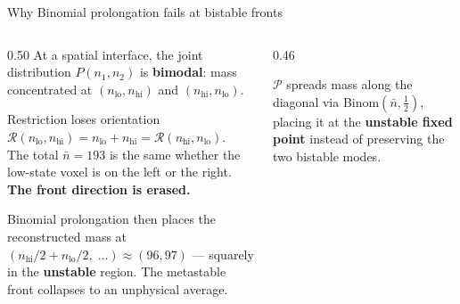 \documentclass[10pt,aspectratio=169]{beamer}
\newcommand{\calR}{\mathcal{R}}
\newcommand{\calP}{\mathcal{P}}
\begin{document}
\begin{frame}{Why Binomial prolongation fails at bistable fronts}

  \begin{columns}[T]
    \begin{column}{0.50\textwidth}
      At a spatial interface, the joint distribution $P(n_1, n_2)$
      is \textbf{bimodal}: mass concentrated at $(n_\text{lo}, n_\text{hi})$
      and $(n_\text{hi}, n_\text{lo})$.

      \medskip
      \begin{alertblock}{Restriction loses orientation}
        $\calR(n_\text{lo}, n_\text{hi}) = n_\text{lo}+n_\text{hi} = \calR(n_\text{hi}, n_\text{lo})$.\\[0.3em]
        The total $\bar n = 193$ is the same whether the low-state voxel
        is on the left or the right.
        \textbf{The front direction is erased.}
      \end{alertblock}

      \medskip
      Binomial prolongation then places the reconstructed mass at
      $(n_\text{hi}/2{+}n_\text{lo}/2,\;\ldots) \approx (96, 97)$ ---
      squarely in the \textbf{unstable} region.
      The metastable front collapses to an unphysical average.
    \end{column}

    \begin{column}{0.46\textwidth}
      \begin{center}
      \end{center}
      {\footnotesize
        $\calP$ spreads mass along the diagonal via Binom$(\bar n,\tfrac12)$,
        placing it at the \textcolor{intercolor}{\textbf{unstable fixed point}} instead of
        preserving the two bistable modes.
      }
    \end{column}
  \end{columns}

\end{frame}
\end{document}
